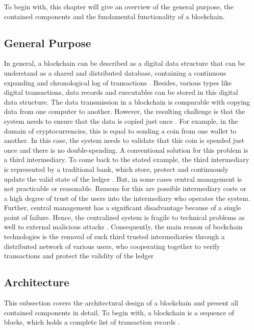 To begin with, this chapter will give an overview of the general purpose, the contained components and the fundamental functionality of a blockchain. 

\subsection{General Purpose}
In general, a blockchain can be described as a digital data structure that can be understand as a shared and distributed database, containing a continuous expanding and chronological log of transactions \cite{andoni2019blockchain}. Besides, various types like digital transactions, data records and executables can be stored in this digital data structure. The data transmission in a blockchain is comparable with copying data from one computer to another. However, the resulting challenge is that the system needs to ensure that the data is copied just once \cite{andoni2019blockchain}. For example, in the domain of cryptocurrencies, this is equal to sending a coin from one wallet to another. In this case, the system needs to validate that this coin is spended just once and there is no double-spending. A conventional solution for this problem is a third intermediary. To come back to the stated example, the third intermediary is represented by a traditional bank, which store, protect and continuously update the valid state of the ledger \cite{andoni2019blockchain}. But, in some cases central management is not practicable or reasonable. Reasons for this are possible intermediary costs or a high degree of trust of the users into the intermediary who operates the system. Further, central management has a significant disadvantage because of a single point of failure. Hence, the centralized system is fragile to technical problems as well to external malicious attacks \cite{andoni2019blockchain}.
Consequently, the main reason of bockchain technologies is the removal of such third trusted intermediaries through a distributed network of various users, who cooperating together to verify transactions and protect the validity of the ledger

\subsection{Architecture}
This subsection covers the architectural design of a blockchain and present all contained components in detail. 
To begin with, a blockchain is a sequence of blocks, which holds a complete list of transaction records \cite{zheng2017overview}.


